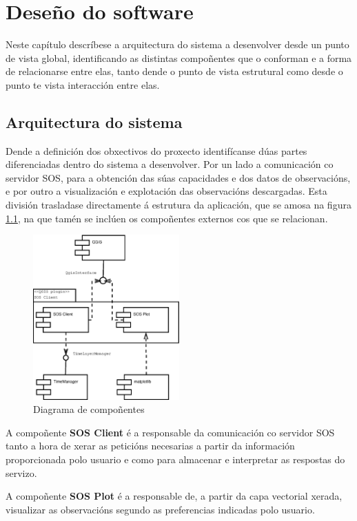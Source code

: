 \chapter{Deseño do software}
Neste capítulo descríbese a arquitectura do sistema a desenvolver desde un punto de vista global, identificando as distintas compoñentes que o conforman e a forma de relacionarse entre elas, tanto dende o punto de vista estrutural como desde o punto te vista interacción entre elas.

\section{Arquitectura do sistema}
Dende a definición dos obxectivos do proxecto identifícanse dúas partes diferenciadas dentro do sistema a desenvolver. Por un lado a comunicación co servidor SOS, para a obtención das súas capacidades e dos datos de observacións, e por outro a visualización e explotación das observacións descargadas. Esta división trasladase directamente á estrutura da aplicación, que se amosa na figura \ref{fig:diaComponentes}, na que tamén se inclúen os compoñentes externos cos que se relacionan.

\begin{figure}[hbtp]
 \centering
 \includegraphics[width=0.5\textwidth]{images/componentes.eps}
 \caption{Diagrama de compoñentes}
 \label{fig:diaComponentes}
\end{figure}

A compoñente \textbf{SOS Client} é a responsable da comunicación co servidor SOS tanto a hora de xerar as peticións necesarias a partir da información proporcionada polo usuario e como para almacenar e interpretar as respostas do servizo.

A compoñente \textbf{SOS Plot} é a responsable de, a partir da capa vectorial xerada, visualizar as observacións segundo as preferencias indicadas polo usuario.

